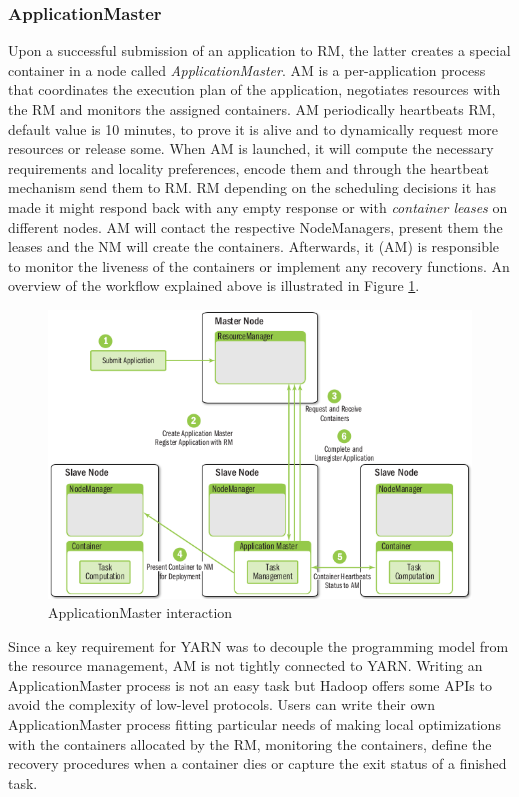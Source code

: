 \subsubsection{ApplicationMaster}
\label{sssec:am}
Upon a successful submission of an application to RM, the latter
creates a special container in a node called
\emph{ApplicationMaster}. AM is a per-application process that
coordinates the execution plan of the application, negotiates
resources with the RM and monitors the assigned containers. AM
periodically heartbeats RM, default value is 10 minutes, to prove it
is alive and to dynamically request more resources or release
some. When AM is launched, it will compute the necessary requirements
and locality preferences, encode them and through the heartbeat
mechanism send them to RM. RM depending on the scheduling decisions it
has made it might respond back with any empty response or with
\emph{container leases} on different nodes. AM will contact the
respective NodeManagers, present them the leases and the NM will
create the containers. Afterwards, it (AM) is responsible to monitor the liveness
of the containers or implement any recovery functions. An overview of
the workflow explained above is illustrated in Figure \ref{fig:yarn_am_rm_interaction}.

\begin{figure}
\centering
\includegraphics[scale=0.6]{resources/images/Background/AM_RM_interaction.png}
\caption{ApplicationMaster interaction \cite{Murthy:2014:AHY:2636998}}
\label{fig:yarn_am_rm_interaction}
\end{figure}

Since a key requirement for YARN was to decouple the programming model
from the resource management, AM is not tightly connected to YARN.
Writing an ApplicationMaster process is not an easy task but Hadoop
offers some APIs to avoid the complexity of low-level protocols.
Users can write their own ApplicationMaster
process fitting particular needs of making local optimizations with
the containers allocated by the RM, monitoring the containers,
define the recovery procedures when a container dies or capture the
exit status of a finished task.

